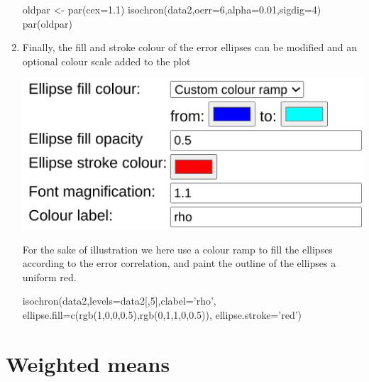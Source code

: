 \begin{refsection}
\begin{enumerate}
\begin{script}
oldpar <- par(cex=1.1)
isochron(data2,oerr=6,alpha=0.01,sigdig=4)
par(oldpar)
\end{script}

\item Finally, the fill and stroke colour of the error ellipses can be
  modified and an optional colour scale added to the plot

\noindent\begin{minipage}[t]{.45\linewidth}
  \strut\vspace*{-\baselineskip}\newline
  \includegraphics[width=\linewidth]{../figures/OtherRegressionFillStroke.png}
\end{minipage}
\begin{minipage}[t]{.55\linewidth}
For the sake of illustration we here use a colour ramp to fill the
ellipses according to the error correlation, and paint the outline of
the ellipses a uniform red.
\end{minipage}

\begin{script}[firstnumber=2]
isochron(data2,levels=data2[,5],clabel='rho',
         ellipse.fill=c(rgb(1,0,0,0.5),rgb(0,1,1,0,0.5)),
         ellipse.stroke='red')
\end{script}
  
\end{enumerate}

\section{Weighted means}\label{sec:OtherWeightedMean}


\end{refsection}
